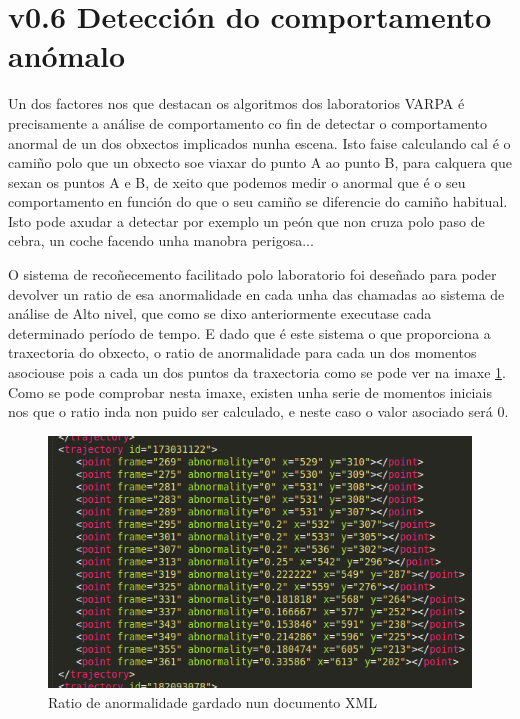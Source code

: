     
\section{v0.6 Detección do comportamento anómalo}
    
    Un dos factores nos que destacan os algoritmos dos laboratorios VARPA é precisamente a análise
    de comportamento co fin de detectar o comportamento anormal de un dos obxectos implicados nunha
    escena. Isto faise calculando cal é o camiño polo que un obxecto soe viaxar do punto A ao 
    punto B, para calquera que sexan os puntos A e B, de xeito que podemos medir o anormal que é
    o seu comportamento en función do que o seu camiño se diferencie do camiño habitual. Isto pode
    axudar a detectar por exemplo un peón que non cruza polo paso de cebra, un coche facendo unha 
    manobra perigosa...
    
    O sistema de recoñecemento facilitado polo laboratorio foi deseñado para poder devolver un ratio
    de esa anormalidade en cada unha das chamadas ao sistema de análise de Alto nivel, que como se 
    dixo anteriormente executase cada determinado período de tempo. E dado que é este sistema o que
    proporciona a traxectoria do obxecto, o ratio de anormalidade para cada un dos momentos 
    asociouse pois a cada un dos puntos da traxectoria como se pode ver na imaxe \ref{fig:abXmlRate}.
    Como se pode comprobar nesta imaxe, existen unha serie de momentos iniciais nos que o ratio inda
    non puido ser calculado, e neste caso o valor asociado será 0.
    
    \begin{figure}[htp]
    \begin{center}
        \includegraphics[scale=0.5]{figures/abXmlRate.png}
        \caption{Ratio de anormalidade gardado nun documento XML}
    \label{fig:abXmlRate}
    \end{center}
    \end{figure}
    
